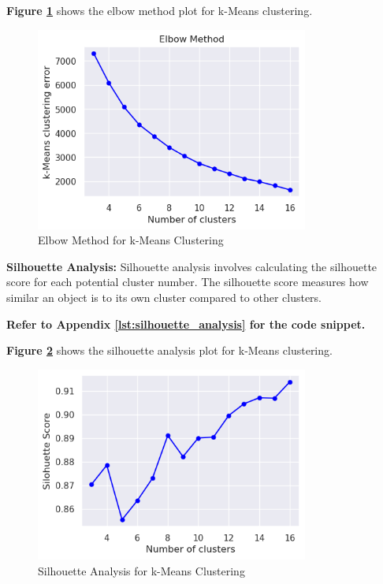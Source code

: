         \textbf{Figure \ref{fig:elbow-method}} shows the elbow method plot for k-Means clustering.

        \begin{figure}[h]
            \centering
            \includegraphics[width=0.8\textwidth]{../figures/plots/section3/k-means_clustering_error.png}
            \caption{Elbow Method for k-Means Clustering}
            \label{fig:elbow-method}
        \end{figure}

        \textbf{Silhouette Analysis:} Silhouette analysis involves calculating the silhouette score for each potential cluster number. The silhouette score measures how similar an object is to its own cluster compared to other clusters.
        
        \vspace{0.5em}

        \textbf{Refer to Appendix \ref{lst:silhouette_analysis} for the code snippet.}

        \textbf{Figure \ref{fig:silhouette-analysis}} shows the silhouette analysis plot for k-Means clustering.

        \begin{figure}[h]
            \centering
            \includegraphics[width=0.8\textwidth]{../figures/plots/section3/k-means_silohuette_score.png}
            \caption{Silhouette Analysis for k-Means Clustering}
            \label{fig:silhouette-analysis}
        \end{figure}

